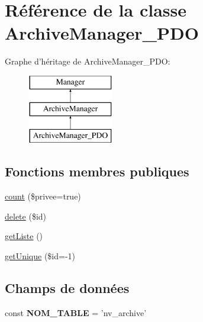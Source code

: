 \hypertarget{class_library_1_1_models_1_1_archive_manager___p_d_o}{\section{Référence de la classe Archive\+Manager\+\_\+\+P\+D\+O}
\label{class_library_1_1_models_1_1_archive_manager___p_d_o}
}
Graphe d'héritage de Archive\+Manager\+\_\+\+P\+D\+O\+:\begin{figure}[H]
\begin{center}
\leavevmode
\includegraphics[height=3.000000cm]{class_library_1_1_models_1_1_archive_manager___p_d_o}
\end{center}
\end{figure}
\subsection*{Fonctions membres publiques}
\begin{DoxyCompactItemize}
\item 
\hyperlink{class_library_1_1_models_1_1_archive_manager___p_d_o_a9bab926bf7f0b5a34ba16a961cf821fd}{count} (\$privee=true)
\item 
\hyperlink{class_library_1_1_models_1_1_archive_manager___p_d_o_a2f8258add505482d7f00ea26493a5723}{delete} (\$id)
\item 
\hyperlink{class_library_1_1_models_1_1_archive_manager___p_d_o_a20b3a2f576f3ea746f769779a329491e}{get\+Liste} ()
\item 
\hyperlink{class_library_1_1_models_1_1_archive_manager___p_d_o_ace29bfa06606e8b8ed9cb411e44cd60b}{get\+Unique} (\$id=-\/1)
\end{DoxyCompactItemize}
\subsection*{Champs de données}
\begin{DoxyCompactItemize}
\item 
\hypertarget{class_library_1_1_models_1_1_archive_manager___p_d_o_a243755033f10b0817aa9d990cc252817}{const {\bfseries N\+O\+M\+\_\+\+T\+A\+B\+L\+E} = 'nv\+\_\+archive'}\label{class_library_1_1_models_1_1_archive_manager___p_d_o_a243755033f10b0817aa9d990cc252817}

\end{DoxyCompactItemize}
